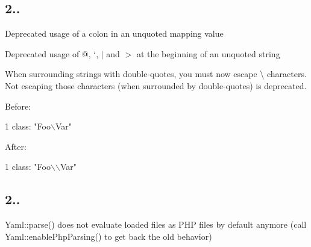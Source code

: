 \subsection*{2.. }


\begin{DoxyItemize}
\item Deprecated usage of a colon in an unquoted mapping value
\item Deprecated usage of @, `, $\vert$ and $>$ at the beginning of an unquoted string
\item When surrounding strings with double-\/quotes, you must now escape {\ttfamily \textbackslash{}} characters. Not escaping those characters (when surrounded by double-\/quotes) is deprecated.

Before\+:
\end{DoxyItemize}


\begin{DoxyCode}
1 class: "Foo\(\backslash\)Var"
\end{DoxyCode}


After\+:


\begin{DoxyCode}
1 class: "Foo\(\backslash\)\(\backslash\)Var"
\end{DoxyCode}


\subsection*{2.. }


\begin{DoxyItemize}
\item Yaml\+::parse() does not evaluate loaded files as P\+HP files by default anymore (call Yaml\+::enable\+Php\+Parsing() to get back the old behavior) 
\end{DoxyItemize}